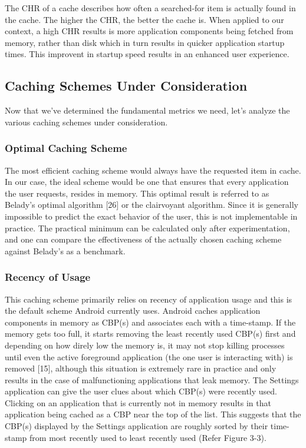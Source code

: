 \documentclass[12pt]{uthesis-v12}  %
\begin{document}
			The CHR of a cache describes how often a searched-for item is actually found in the cache. The higher the CHR, the better the cache is. When applied to our context, a high CHR results is more application components being fetched from memory, rather than disk which in turn results in quicker application startup times. This improvent in startup speed results in an enhanced user experience.   
		
		\subsection{Caching Schemes Under Consideration}
			Now that we've determined the fundamental metrics we need, let's analyze the various caching schemes under consideration.
			
			\subsubsection{Optimal Caching Scheme}
				The most efficient caching scheme would always have the requested item in cache. In our case, the ideal scheme would be one that ensures that every application the user requests, resides in memory. This optimal result is referred to as Belady's optimal algorithm [26] or the clairvoyant algorithm. Since it is generally impossible to predict the exact behavior of the user, this is not implementable in practice. The practical minimum can be calculated only after experimentation, and one can compare the effectiveness of the actually chosen caching scheme against Belady's as a benchmark.
			
			\subsubsection{Recency of Usage}
				This caching scheme primarily relies on recency of application usage and this is the default scheme Android currently uses. Android caches application components in memory as CBP(s) and associates each with a time-stamp. If the memory gets too full, it starts removing the least recently used CBP(s) first and depending on how direly low the memory is, it may not stop killing processes until even the active foreground application (the one user is interacting with) is removed [15], although this situation is extremely rare in practice and only results in the case of malfunctioning applications that leak memory. The Settings application can give the user clues about which CBP(s) were recently used. Clicking on an application that is currently not in memory results in that application being cached as a CBP near the top of the list. This suggests that the CBP(s) displayed by the Settings application are roughly sorted by their time-stamp from most recently used to least recently used (Refer Figure 3-3). 
				
\end{document}

